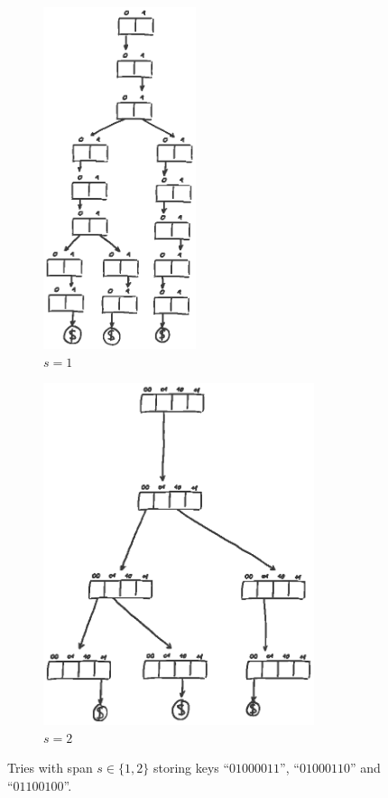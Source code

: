 \documentclass[abstracton,12pt]{scrartcl}
\theoremstyle{definition}
\begin{document}
\begin{figure}[h]
  \centering
  \begin{subfigure}[b]{0.4\textwidth}
    \includegraphics[height=10cm,trim={2cm 17.5cm 2.5cm 1.5cm},clip]{trie_s1_draw}
    \caption{$s=1$}
    \label{fig:span1}
  \end{subfigure}
  \begin{subfigure}[b]{0.55\textwidth}
    \includegraphics[height=10cm,trim={2cm 18.5cm 2.5cm 0.5cm},clip]{trie_s2_draw}
    \caption{$s=2$}
    \label{fig:span2}
  \end{subfigure}
  \caption{
    Tries with span $s \in \{1,2\}$ storing keys ``$01000011$'', ``$01000110$''
    and ``$01100100$''.
  }
\end{figure}
\end{document}
